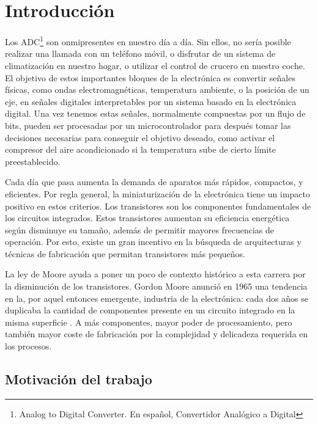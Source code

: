 \documentclass[12pt]{report} %
\begin{document}
\newpage %
\thispagestyle{empty}
\mbox{}

\clearpage
{} %

\chapter{Introducción}

	Los ADC\footnote{Analog to Digital Converter. En español, Convertidor Analógico a Digital} son onmipresentes en nuestro día a día. Sin ellos, no sería posible realizar una llamada con un teléfono móvil, o disfrutar de un sistema de climatización en nuestro hogar, o utilizar el control de crucero en nuestro coche. El objetivo de estos importantes bloques de la electrónica es convertir señales físicas, como ondas electromagnéticas, temperatura ambiente, o la posición de un eje, en señales digitales interpretables por un sistema basado en la electrónica digital. Una vez tenemos estas señales, normalmente compuestas por un flujo de bits, pueden ser procesadas por un microcontrolador para después tomar las decisiones necesarias para conseguir el objetivo deseado, como activar el compresor del aire acondicionado si la temperatura sube de cierto límite preestablecido.
	
	Cada día que pasa aumenta la demanda de aparatos más rápidos, compactos, y eficientes. Por regla general, la miniaturización de la electrónica tiene un impacto positivo en estos criterios. Los transistores son los componentes fundamentales de los circuitos integrados. Estos transistores aumentan su eficiencia energética según disminuye su tamaño, además de permitir mayores frecuencias de operación. Por esto, existe un gran incentivo en la búsqueda de arquitecturas y técnicas de fabricación que permitan transistores más pequeños.
	
	La ley de Moore ayuda a poner un poco de contexto histórico a esta carrera por la disminución de los transistores. Gordon Moore anunció en 1965 una tendencia en la, por aquel entonces emergente, industria de la electrónica: cada dos años se duplicaba la cantidad de componentes presente en un circuito integrado en la misma superficie \cite{moorelaw}. A más componentes, mayor poder de procesamiento, pero también mayor coste de fabricación por la complejidad y delicadeza requerida en los procesos.
	
	\section{Motivación del trabajo}
	
\end{document}

